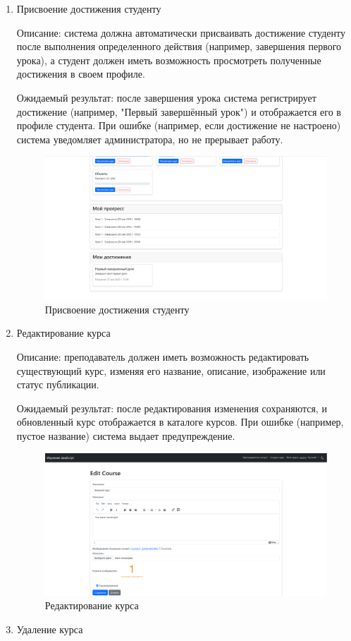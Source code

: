 \begin{enumerate}
	\item Присвоение достижения студенту
	
Описание: система должна автоматически присваивать достижение студенту после выполнения определенного действия (например, завершения первого урока), а студент должен иметь возможность просмотреть полученные достижения в своем профиле.
	
Ожидаемый результат: после завершения урока система регистрирует достижение (например, "Первый завершённый урок") и отображается его в профиле студента. При ошибке (например, если достижение не настроено) система уведомляет администратора, но не прерывает работу.
	
	\begin{figure}[ht]
		\centering
		\includegraphics[width=1\textwidth]{images/достижение} 
		\caption{Присвоение достижения студенту}
		\label{achiv:image}
	\end{figure}
	
	\item Редактирование курса
	
Описание: преподаватель должен иметь возможность редактировать существующий курс, изменяя его название, описание, изображение или статус публикации.
	
Ожидаемый результат: после редактирования изменения сохраняются, и обновленный курс отображается в каталоге курсов. При ошибке (например, пустое название) система выдает предупреждение.
	
	\begin{figure}[ht]
		\centering
		\includegraphics[width=1\textwidth]{images/редактироватькурс} 
		\caption{Редактирование курса}
		\label{editcourse:image}
	\end{figure}
\newpage	
	\item Удаление курса
	

\end{enumerate}
